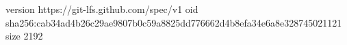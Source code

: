 version https://git-lfs.github.com/spec/v1
oid sha256:cab34ad4b26c29ae9807b0c59a8825dd776662d4b8efa34e6a8e328745021121
size 2192
